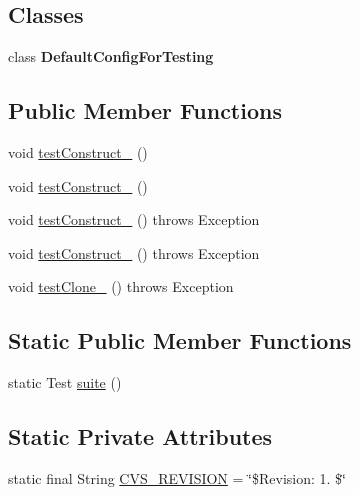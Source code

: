 \subsection*{Classes}
\begin{DoxyCompactItemize}
\item 
class {\bfseries Default\-Config\-For\-Testing}
\end{DoxyCompactItemize}
\subsection*{Public Member Functions}
\begin{DoxyCompactItemize}
\item 
void \hyperlink{classorg_1_1jgap_1_1impl_1_1_default_configuration_test_a212d437a71c55da7cf19e0a8bb2799a1}{test\-Construct\-\_} ()
\item 
void \hyperlink{classorg_1_1jgap_1_1impl_1_1_default_configuration_test_af972598d7e759a8096ccc2f4a879e04f}{test\-Construct\-\_} ()
\item 
void \hyperlink{classorg_1_1jgap_1_1impl_1_1_default_configuration_test_aa4c69941935220c1490ab7aef3d7a095}{test\-Construct\-\_} ()  throws Exception 
\item 
void \hyperlink{classorg_1_1jgap_1_1impl_1_1_default_configuration_test_acceadf7c730c20a33d10b0d957ab60aa}{test\-Construct\-\_} ()  throws Exception 
\item 
void \hyperlink{classorg_1_1jgap_1_1impl_1_1_default_configuration_test_a000e42638df318c57d6604e6cebf9b5f}{test\-Clone\-\_} ()  throws Exception 
\end{DoxyCompactItemize}
\subsection*{Static Public Member Functions}
\begin{DoxyCompactItemize}
\item 
static Test \hyperlink{classorg_1_1jgap_1_1impl_1_1_default_configuration_test_a32a6a40a31094b93da7343c339950b24}{suite} ()
\end{DoxyCompactItemize}
\subsection*{Static Private Attributes}
\begin{DoxyCompactItemize}
\item 
static final String \hyperlink{classorg_1_1jgap_1_1impl_1_1_default_configuration_test_a00cfb58110522e10dcf3b974d8d26b96}{C\-V\-S\-\_\-\-R\-E\-V\-I\-S\-I\-O\-N} = \char`\"{}\$Revision\-: 1. \$\char`\"{}
\end{DoxyCompactItemize}

